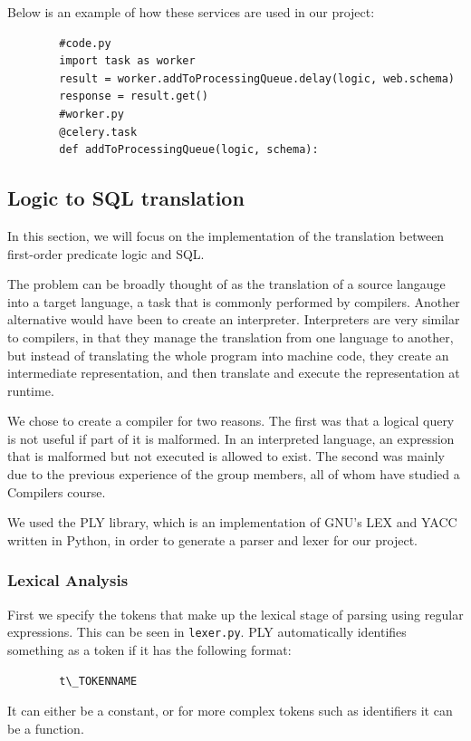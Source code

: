 \documentclass[a4paper, 11pt]{article}
\begin{document}
      Below is an example of how these services are used in our project: 
      \begin{verbatim}
        #code.py
        import task as worker
        result = worker.addToProcessingQueue.delay(logic, web.schema)
        response = result.get()
        #worker.py
        @celery.task
        def addToProcessingQueue(logic, schema):
      \end{verbatim}

    \subsection{Logic to SQL translation}

      In this section, we will focus on the implementation of the translation
      between first-order predicate logic and SQL.

      The problem can be broadly thought of as the translation of a source
      langauge into a target language, a task that is commonly performed by
      compilers. Another alternative would have been to create an interpreter.
      Interpreters are very similar to compilers, in that they manage the
      translation from one language to another, but instead of translating the
      whole program into machine code, they create an intermediate
      representation, and then translate and execute the representation at
      runtime.

      We chose to create a compiler for two reasons. The first was that a
      logical query is not useful if part of it is malformed. In an interpreted
      language, an expression that is malformed but not executed is allowed to
      exist. The second was mainly due to the previous experience of the group
      members, all of whom have studied a Compilers course.

      We used the PLY library, which is an implementation of GNU's LEX and YACC
      written in Python, in order to generate a parser and lexer for our
      project.
    \subsubsection{Lexical Analysis}

      First we specify the tokens that make up the lexical stage of parsing
      using regular expressions. This can be seen in
      \texttt{lexer.py}. PLY automatically identifies something as a token if it
      has the following format:
      \begin{verbatim}
        t\_TOKENNAME
      \end{verbatim}
      It can either be a constant, or for more complex tokens such as
      identifiers it can be a function.
\end{document}
